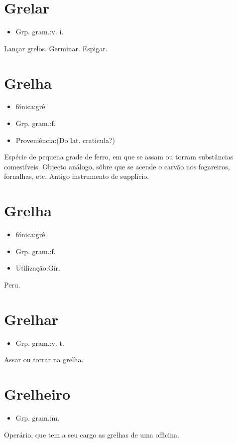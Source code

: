 \section{Grelar}
\begin{itemize}
\item {Grp. gram.:v. i.}
\end{itemize}
Lançar grelos.
Germinar.
Espigar.
\section{Grelha}
\begin{itemize}
\item {fónica:grê}
\end{itemize}
\begin{itemize}
\item {Grp. gram.:f.}
\end{itemize}
\begin{itemize}
\item {Proveniência:(Do lat. \textunderscore craticula\textunderscore ?)}
\end{itemize}
Espécie de pequena grade de ferro, em que se assam ou torram substâncias comestíveis.
Objecto análogo, sôbre que se acende o carvão nos fogareiros, fornalhas, etc.
Antigo instrumento de supplício.
\section{Grelha}
\begin{itemize}
\item {fónica:grê}
\end{itemize}
\begin{itemize}
\item {Grp. gram.:f.}
\end{itemize}
\begin{itemize}
\item {Utilização:Gír.}
\end{itemize}
Peru.
\section{Grelhar}
\begin{itemize}
\item {Grp. gram.:v. t.}
\end{itemize}
Assar ou torrar na grelha.
\section{Grelheiro}
\begin{itemize}
\item {Grp. gram.:m.}
\end{itemize}
Operário, que tem a seu cargo as grelhas de uma officina.
